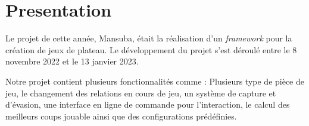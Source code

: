 \section*{Presentation}

Le projet de cette année, Mansuba, était la réalisation d'un \emph{framework} pour la création de jeux de plateau.
Le développement du projet s'est déroulé entre le 8 novembre 2022 et le 13 janvier 2023. 

Notre projet contient plusieurs fonctionnalités comme : Plusieurs type de pièce de jeu, le changement des relations en cours de jeu, 
un système de capture et d'évasion, une interface en ligne de commande pour l'interaction, le calcul des meilleurs coups jouable ainsi que 
des configurations prédéfinies.

